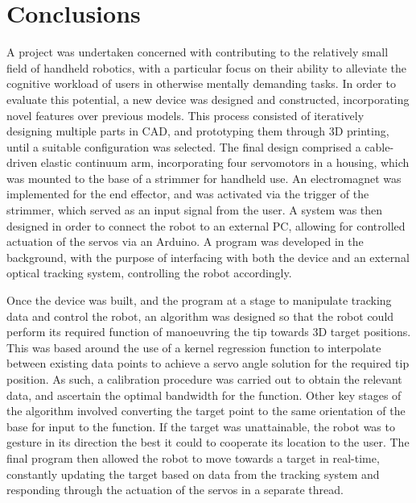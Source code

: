 \documentclass[11pt]{article}
\begin{document}
 

\pagebreak
\section{Conclusions}

A project was undertaken concerned with contributing to the relatively small field of handheld robotics, with a particular focus on their ability to alleviate the cognitive workload of users in otherwise mentally demanding tasks. In order to evaluate this potential, a new device was designed and constructed, incorporating novel features over previous models. This process consisted of iteratively designing multiple parts in CAD, and prototyping them through 3D printing, until a suitable configuration was selected. The final design comprised a cable-driven elastic continuum arm, incorporating four servomotors in a housing, which was mounted to the base of a strimmer for handheld use. An electromagnet was implemented for the end effector, and was activated via the trigger of the strimmer, which served as an input signal from the user. A system was then designed in order to connect the robot to an external PC, allowing for controlled actuation of the servos via an Arduino. A program was developed in the background, with the purpose of interfacing with both the device and an external optical tracking system, controlling the robot accordingly.

Once the device was built, and the program at a stage to manipulate tracking data and control the robot, an algorithm was designed so that the robot could perform its required function of manoeuvring the tip towards 3D target positions. This was based around the use of a kernel regression function to interpolate between existing data points to achieve a servo angle solution for the required tip position. As such, a calibration procedure was carried out to obtain the relevant data, and ascertain the optimal bandwidth for the function. Other key stages of the algorithm involved converting the target point to the same orientation of the base for input to the function. If the target was unattainable, the robot was to gesture in its direction the best it could to cooperate its location to the user. The final program then allowed the robot to move towards a target in real-time, constantly updating the target based on data from the tracking system and responding through the actuation of the servos in a separate thread. 
\end{document}
